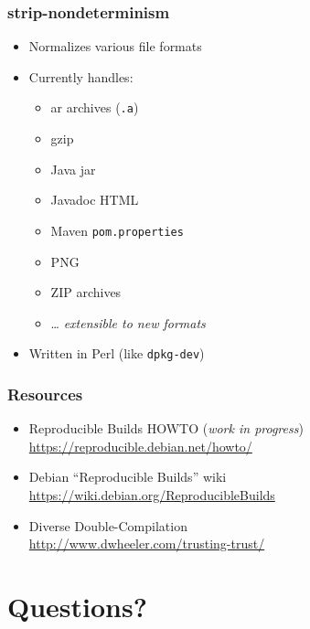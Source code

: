 \documentclass[14pt,aspectratio=169]{beamer}
\begin{document}
\begin{frame}
 \frametitle{strip-nondeterminism}

 \begin{itemize}
  \item Normalizes various file formats
  \item Currently handles:
   \begin{itemize}
    \item ar archives (\texttt{.a})
    \item gzip
    \item Java jar
    \item Javadoc HTML
    \item Maven \texttt{pom.properties}
    \item PNG
    \item ZIP archives
    \item … \textit{extensible to new formats}
   \end{itemize}
  \item Written in Perl (like \texttt{dpkg-dev})
 \end{itemize}
\end{frame}

\begin{frame}
 \frametitle{Resources}

 \begin{itemize}
  \item Reproducible Builds HOWTO (\textit{work in progress})\\
   \url{https://reproducible.debian.net/howto/}
  \item<2-> Debian “Reproducible Builds” wiki \\
   \url{https://wiki.debian.org/ReproducibleBuilds}
  \item<3> Diverse Double-Compilation \\
   \url{http://www.dwheeler.com/trusting-trust/}
 \end{itemize}
\end{frame}

\section{Questions?}
\end{document}
